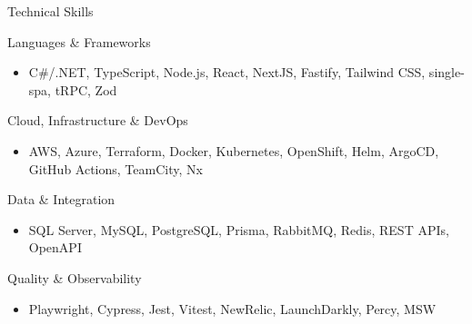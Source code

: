 \documentclass{mcdowellcv}
\begin{document}
\begin{cvsection}{Technical Skills}
    \begin{cvsubsection}{Languages \& Frameworks}{}{}
        \begin{itemize}
            \item C\#/.NET, TypeScript, Node.js, React, NextJS, Fastify, Tailwind CSS, single-spa, tRPC, Zod
        \end{itemize}
    \end{cvsubsection}

    \begin{cvsubsection}{Cloud, Infrastructure \& DevOps}{}{}
        \begin{itemize}
            \item AWS, Azure, Terraform, Docker, Kubernetes, OpenShift, Helm, ArgoCD, GitHub Actions, TeamCity, Nx
        \end{itemize}
    \end{cvsubsection}

    \begin{cvsubsection}{Data \& Integration}{}{}
        \begin{itemize}
            \item SQL Server, MySQL, PostgreSQL, Prisma, RabbitMQ, Redis, REST APIs, OpenAPI
        \end{itemize}
    \end{cvsubsection}

    \begin{cvsubsection}{Quality \& Observability}{}{}
        \begin{itemize}
            \item Playwright, Cypress, Jest, Vitest, NewRelic, LaunchDarkly, Percy, MSW
        \end{itemize}
    \end{cvsubsection}
\end{cvsection}
\end{document}
